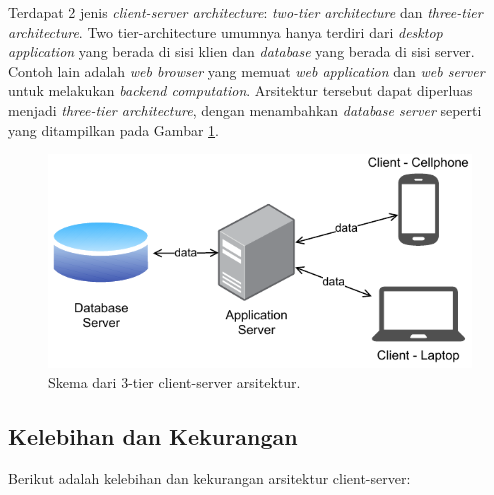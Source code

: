 Terdapat 2 jenis \textit{client-server architecture}: \textit{two-tier architecture} dan \textit{three-tier architecture}. Two tier-architecture umumnya hanya terdiri dari \textit{desktop application} yang berada di sisi klien dan \textit{database} yang berada di sisi server. Contoh lain adalah \textit{web browser} yang memuat \textit{web application} dan \textit{web server} untuk melakukan \textit{backend computation}.
Arsitektur tersebut dapat diperluas menjadi \textit{three-tier architecture}, dengan menambahkan \textit{database server} seperti yang ditampilkan pada Gambar \ref{fig:client-server-schema}.

\begin{figure}[h]
\centering
\includegraphics[width=\textwidth]{../images/client-server-3-tier}
\caption{Skema dari 3-tier client-server arsitektur.}
\label{fig:client-server-schema}
\end{figure}

\subsection{Kelebihan dan Kekurangan}
Berikut adalah kelebihan dan kekurangan arsitektur client-server:


